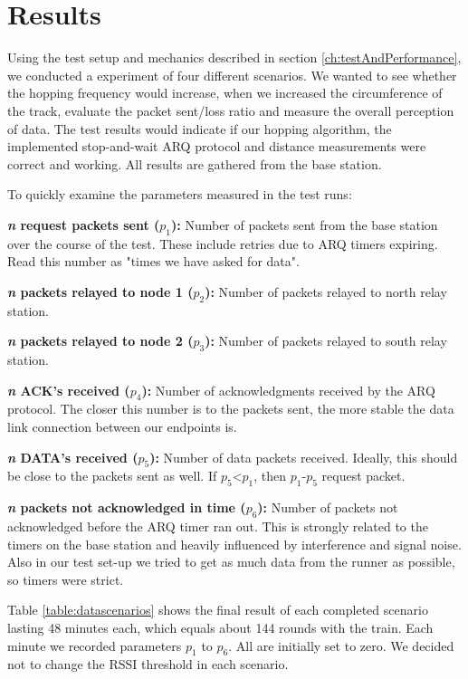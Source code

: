 \section{Results}\label{ch:results}

Using the test setup and mechanics described in section \ref{ch:testAndPerformance}, we conducted a experiment of four different scenarios. We wanted to see whether the hopping frequency would increase, when we increased the circumference of the track, evaluate the packet sent/loss ratio and measure the overall perception of data. The test results would indicate if our hopping algorithm, the implemented stop-and-wait ARQ protocol and distance measurements were correct and working. All results are gathered from the base station.

\noindent To quickly examine the parameters measured in the test runs:

\noindent \textbf{\textit{n} request packets sent ($p_1$):} Number of packets sent from the base station over the course of the test. These include retries due to ARQ timers expiring. Read this number as "times we have asked for data".

\noindent \textbf{\textit{n} packets relayed to node 1 ($p_2$):} Number of packets relayed to north relay station.

\noindent \textbf{\textit{n} packets relayed to node 2 ($p_3$):} Number of packets relayed to south relay station.

\noindent \textbf{\textit{n} ACK's received ($p_4$):} Number of acknowledgments received by the ARQ protocol. The closer this number is to the packets sent, the more stable the data link connection between our endpoints is.

\noindent \textbf{\textit{n} DATA's received ($p_5$):} Number of data packets received. Ideally, this should be close to the packets sent as well. If $p_5$<$p_1$, then $p_1$-$p_5$ request packet.

\noindent \textbf{\textit{n} packets not acknowledged in time ($p_6$):} Number of packets not acknowledged before the ARQ timer ran out. This is strongly related to the timers on the base station and heavily influenced by interference and signal noise. Also in our test set-up we tried to get as much data from the runner as possible, so timers were strict.

\noindent Table \ref{table:datascenarios} shows the final result of each completed scenario lasting 48 minutes each, which equals about 144 rounds with the train. Each minute we recorded parameters $p_1$ to $p_6$. All are initially set to zero. We decided not to change the RSSI threshold in each scenario.

